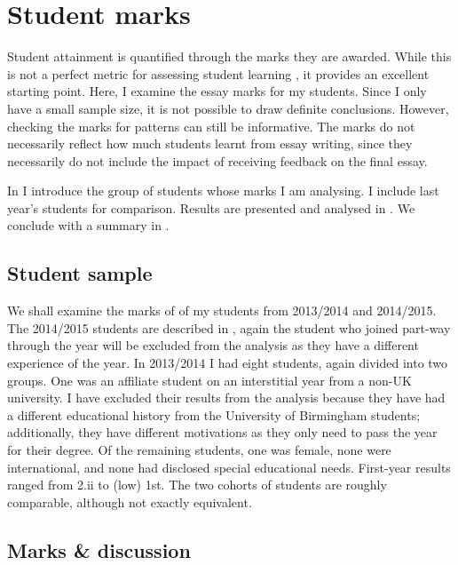 \chapter{Student marks}\label{ap:marks}

Student attainment is quantified through the marks they are awarded. While this is not a perfect metric for assessing student learning \citep[cf.][chapter 11]{Ramsden1992}, it provides an excellent starting point. Here, I examine the essay marks for my students. Since I only have a small sample size, it is not possible to draw definite conclusions. However, checking the marks for patterns can still be informative. The marks do not necessarily reflect how much students learnt from essay writing, since they necessarily do not include the impact of receiving feedback on the final essay.

In  I introduce the group of students whose marks I am analysing. I include last year's students for comparison. Results are presented and analysed in . We conclude with a summary in .

\section{Student sample}\label{sec:marks-students}

We shall examine the marks of of my students from 2013/2014 and 2014/2015. The 2014/2015 students are described in , again the student who joined part-way through the year will be excluded from the analysis as they have a different experience of the year. In 2013/2014 I had eight students, again divided into two groups. One was an affiliate student on an interstitial year from a non-UK university. I have excluded their results from the analysis because they have had a different educational history from the University of Birmingham students; additionally, they have different motivations as they only need to pass the year for their degree. Of the remaining students, one was female, none were international, and none had disclosed special educational needs. First-year results ranged from 2.ii to (low) 1st. The two cohorts of students are roughly comparable, although not exactly equivalent.

\section{Marks \& discussion}\label{sec:plots}


